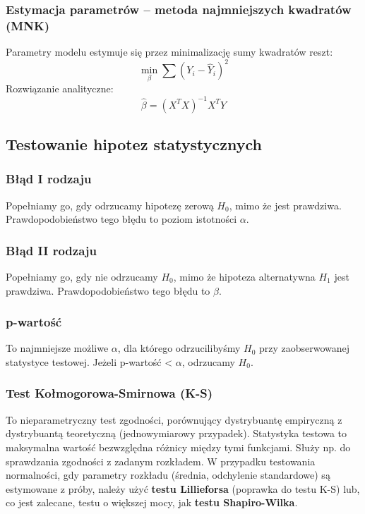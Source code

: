 \subsubsection*{Estymacja parametrów -- metoda najmniejszych kwadratów (MNK)}
Parametry modelu estymuje się przez minimalizację sumy kwadratów reszt:
$$
\min_\beta \sum (Y_i - \hat{Y}_i)^2
$$
Rozwiązanie analityczne:
$$
\hat{\beta} = (X^T X)^{-1} X^T Y
$$

\subsection{Testowanie hipotez statystycznych}
\subsubsection*{Błąd I rodzaju}
Popełniamy go, gdy odrzucamy hipotezę zerową $H_0$, mimo że jest prawdziwa. Prawdopodobieństwo tego błędu to poziom istotności $\alpha$.

\subsubsection*{Błąd II rodzaju}
Popełniamy go, gdy nie odrzucamy $H_0$, mimo że hipoteza alternatywna $H_1$ jest prawdziwa. Prawdopodobieństwo tego błędu to $\beta$.

\subsubsection*{p-wartość}
To najmniejsze możliwe $\alpha$, dla którego odrzucilibyśmy $H_0$ przy zaobserwowanej statystyce testowej. Jeżeli p-wartość < $\alpha$, odrzucamy $H_0$.

\subsubsection*{Test Kołmogorowa-Smirnowa (K-S)}
To nieparametryczny test zgodności, porównujący dystrybuantę empiryczną z dystrybuantą teoretyczną (jednowymiarowy przypadek). Statystyka testowa to maksymalna wartość bezwzględna różnicy między tymi funkcjami. Służy np. do sprawdzania zgodności z zadanym rozkładem. W przypadku testowania normalności, gdy parametry rozkładu (średnia, odchylenie standardowe) są estymowane z próby, należy użyć \textbf{testu Lillieforsa} (poprawka do testu K-S) lub, co jest zalecane, testu o większej mocy, jak \textbf{testu Shapiro-Wilka}.
